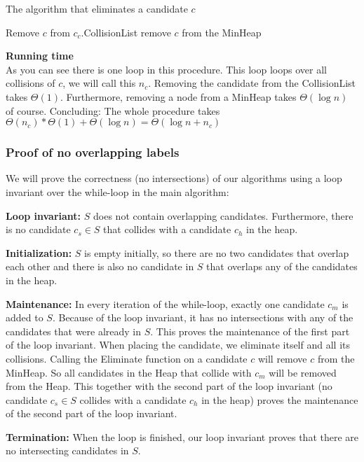 \documentclass[crop=false,a4paper,oneside,11pt]{article}
\begin{document}
\begin{algorithm}[H]
\caption{The algorithm that eliminates a candidate $c$}
\begin{algorithmic}[1]
\State Remove $c$ from $c_c.$CollisionList 
\EndFor
\State remove $c$ from the MinHeap
\EndProcedure
\end{algorithmic}
\end{algorithm}
\textbf{Running time}\\
As you can see there is one loop in this procedure. This loop loops over all collisions of $c$, we will call this $n_c$. Removing the candidate from the CollisionList takes $\Theta(1)$. Furthermore, removing a node from a MinHeap takes $\Theta(\log n)$ of course. Concluding: The whole procedure takes $\Theta(n_c)*\Theta(1)+\Theta(\log n)=\Theta(\log n + n_c)$

\subsubsection{Proof of no overlapping labels}
We will prove the correctness (no intersections) of our algorithms using a loop invariant over the while-loop in the main algorithm:

\textbf{Loop invariant:} $S$ does not contain overlapping candidates. Furthermore, there is no candidate $c_s\in S$ that collides with a candidate $c_h$ in the heap.

\textbf{Initialization:} $S$ is empty initially, so there are no two candidates that overlap each other and there is also no candidate in $S$ that overlaps any of the candidates in the heap.

\textbf{Maintenance:} In every iteration of the while-loop, exactly one candidate $c_m$ is added to $S$. Because of the loop invariant, it has no intersections with any of the candidates that were already in $S$. This proves the maintenance of the first part of the loop invariant. When placing the candidate, we eliminate itself and all its collisions. Calling the Eliminate function on a candidate $c$ will remove $c$ from the MinHeap. So all candidates in the Heap that collide with $c_m$ will be removed from the Heap. This together with the second part of the loop invariant (no candidate $c_s\in S$ collides with a candidate $c_h$ in the heap) proves the maintenance of the second part of the loop invariant.

\textbf{Termination:} When the loop is finished, our loop invariant proves that there are no intersecting candidates in $S$.
\end{document}
